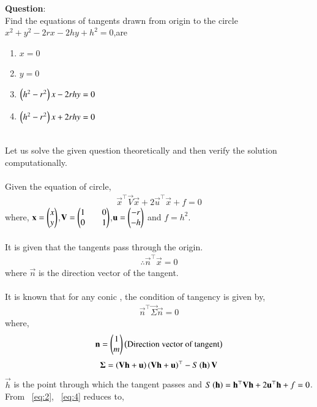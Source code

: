 \documentclass[journal]{IEEEtran}
\begin{document}
\textbf{Question}:\\
Find the equations of tangents drawn from origin to the circle $x^2+y^2-2rx-2hy+h^2=0$,are
\begin{multicols}{2}
\begin{enumerate}
    \item $x=0$
    \item $y=0$
    \item $\left(h^2-r^2\right)x-2rhy=0$
    \item $\left(h^2-r^2\right)x+2rhy=0$
\end{enumerate}
\end{multicols}
\solution \\
Let us solve the given question theoretically and then verify the solution computationally.\\
\\
Given the equation of circle,
\begin{align}
    \vec{x}^{\top}\vec{V}\vec{x}+2\vec{u}^{\top}\vec{x}+f=0 \label{eq:1}
\end{align}
where, $\mathbf{x}=\begin{pmatrix}x\\y\end{pmatrix}$,$\mathbf{V}=\begin{pmatrix}1&&0\\0&&1\end{pmatrix}$,$\mathbf{u}=\begin{pmatrix}-r\\-h\end{pmatrix}$ and $f=h^2$.\\ 
\\
It is given that the tangents pass through the origin.
\begin{align}
    \therefore \vec{n}^{\top}\vec{x}=0 \label{eq:2}
\end{align}
where $\vec{n}$ is the direction vector of the tangent.\\
\\
It is known that for any conic , the condition of tangency is given by,
\begin{align}
    \vec{n}^{\top}\vec{\Sigma}\vec{n}=0 \label{eq:3}
\end{align}
where,
\begin{align}
    \mathbf{n}=\begin{pmatrix}1\\m\end{pmatrix}\left(\text{Direction vector of tangent}\right)
\end{align}
\begin{align}
   \mathbf{\Sigma}=\left(\mathbf{V}\mathbf{h}+\mathbf{u}\right)\left(\mathbf{V}\mathbf{h}+\mathbf{u}\right)^{\top}-S\left(\mathbf{h}\right)\mathbf{V} \label{eq:4}
\end{align}
$\vec{h}$ is the point through which the tangent passes and $S\left(\mathbf{h}\right)=\mathbf{h}^{\top}\mathbf{V}\mathbf{h}+2\mathbf{u}^{\top}\mathbf{h}+f=0$.\\
From ~\eqref{eq:2}, ~\eqref{eq:4} reduces to,
\end{document}
